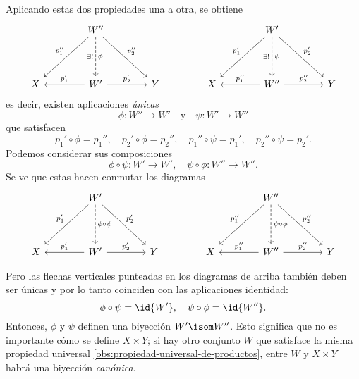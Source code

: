\begin{ejemplo}
  Aplicando estas dos propiedades una a otra, se obtiene
  \[ \begin{tikzcd}[column sep=4em, row sep=4em]
      & W''\ar{dl}[swap]{p_1''}\ar{dr}{p_2''}\ar[dashed]{d}{\phi}[swap]{\exists !} &&& W'\ar{dl}[swap]{p_1'}\ar{dr}{p_2'}\ar[dashed]{d}{\psi}[swap]{\exists !} \\
      X & W'\ar{r}{p_2'}\ar{l}[swap]{p_1'} & Y & X & W''\ar{r}{p_2''}\ar{l}[swap]{p_1''} & Y
    \end{tikzcd} \]
  es decir, existen aplicaciones \emph{únicas}
  $$\phi\colon W''\to W' \quad\text{y}\quad \psi\colon W'\to W''$$
  que satisfacen
  \[ p_1'\circ \phi = p_1'', \quad
    p_2'\circ \phi = p_2'', \quad
    p_1''\circ \psi = p_1', \quad
    p_2''\circ \psi = p_2'. \]
  Podemos considerar sus composiciones
  \[ \phi\circ\psi\colon W'\to W', \quad
    \psi\circ\phi\colon W''\to W''. \]
  Se ve que estas hacen conmutar los diagramas
  $$\begin{tikzcd}[column sep=4em, row sep=4em]
    & W'\ar{dl}[swap]{p_1'}\ar{dr}{p_2'}\ar[dashed]{d}{\phi\circ\psi} &&& W''\ar{dl}[swap]{p_1''}\ar{dr}{p_2''}\ar[dashed]{d}{\psi\circ\phi} \\
    X & W'\ar{r}{p_2'}\ar{l}[swap]{p_1'} & Y & X & W''\ar{r}{p_2''}\ar{l}[swap]{p_1''} & Y
  \end{tikzcd}$$
  \iffalse
  \begin{shaded}
    \begin{align*}
      p_1'\circ (\phi\circ\psi) & = (p_1'\circ \phi)\circ\psi = p_1''\circ \psi = p_1',\\
      p_2'\circ (\phi\circ\psi) & = (p_2'\circ \phi)\circ\psi = p_2''\circ \psi = p_2',\\
      p_1''\circ (\psi\circ\phi) & = (p_1''\circ \psi)\circ\phi = p_1'\circ \phi = p_1'',\\
      p_2''\circ (\psi\circ\phi) & = (p_2''\circ \psi)\circ\phi = p_2'\circ \phi = p_2'';
    \end{align*}
  \end{shaded}
  \fi
  Pero las flechas verticales punteadas en los diagramas de arriba también deben
  ser únicas y por lo tanto coinciden con las aplicaciones identidad:
  $$\phi\circ\psi = \id{W'}, \quad \psi\circ\phi = \id{W''}.$$
  Entonces, $\phi$ y $\psi$ definen una biyección $W' \isom W''$. Esto significa
  que no es importante cómo se define $X\times Y$; si hay otro conjunto $W$ que
  satisface la misma propiedad universal
  \ref{obs:propiedad-universal-de-productos}, entre $W$ y $X\times Y$ habrá una
  biyección \emph{canónica}.
\end{ejemplo}

